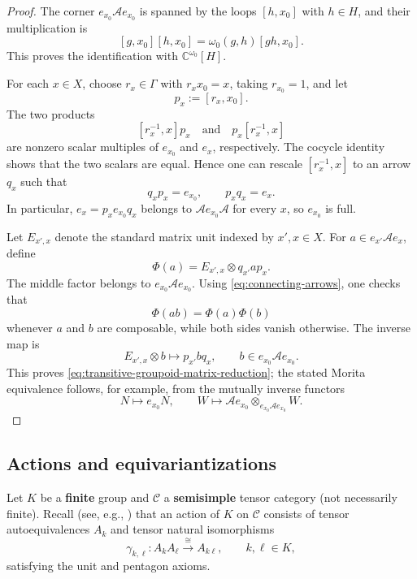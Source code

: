 \documentclass{amsart}
\theoremstyle{definition}
\newcommand{\C}{\mathscr{C}}
\numberwithin{equation}{section}
\begin{document}
\begin{proof}
The corner $e_{x_0}\mathcal A e_{x_0}$ is spanned by the loops $[h,x_0]$ with
$h\in H$, and their multiplication is
\[
 [g,x_0][h,x_0]=\omega_0(g,h)[gh,x_0].
\]
This proves the identification with $\mathbb C^{\omega_0}[H]$.

For each $x\in X$, choose $r_x\in\Gamma$ with $r_xx_0=x$, taking
$r_{x_0}=1$, and let
\[
 p_x:=[r_x,x_0].
\]
The two products
\[
 [r_x^{-1},x]p_x
 \quad\text{and}\quad
 p_x[r_x^{-1},x]
\]
are nonzero scalar multiples of $e_{x_0}$ and $e_x$, respectively.  The cocycle
identity shows that the two scalars are equal.  Hence one can rescale
$[r_x^{-1},x]$ to an arrow $q_x$ such that
\begin{equation}\label{eq:connecting-arrows}
 q_xp_x=e_{x_0},
 \qquad
 p_xq_x=e_x.
\end{equation}
In particular, $e_x=p_xe_{x_0}q_x$ belongs to
$\mathcal A e_{x_0}\mathcal A$ for every $x$, so $e_{x_0}$ is full.

Let $E_{x',x}$ denote the standard matrix unit indexed by $x',x\in X$.  For
$a\in e_{x'}\mathcal A e_x$, define
\begin{equation}\label{eq:explicit-groupoid-matrix-map}
 \Phi(a)=E_{x',x}\otimes q_{x'}ap_x.
\end{equation}
The middle factor belongs to $e_{x_0}\mathcal A e_{x_0}$.  Using
\eqref{eq:connecting-arrows}, one checks that
\[
 \Phi(ab)=\Phi(a)\Phi(b)
\]
whenever $a$ and $b$ are composable, while both sides vanish otherwise.  The
inverse map is
\[
 E_{x',x}\otimes b\longmapsto p_{x'}bq_x,
 \qquad
 b\in e_{x_0}\mathcal A e_{x_0}.
\]
This proves \eqref{eq:transitive-groupoid-matrix-reduction}; the stated Morita
equivalence follows, for example, from the mutually inverse functors
\[
 N\longmapsto e_{x_0}N,
 \qquad
 W\longmapsto \mathcal A e_{x_0}
       \otimes_{e_{x_0}\mathcal A e_{x_0}}W.
\]
\end{proof}

\subsection{Actions and equivariantizations}\label{sec:actions}

Let $K$ be a {\bf finite} group and $\C$ a {\bf semisimple} tensor category (not necessarily finite). Recall (see, e.g., \cite[Definition 2.7.1]{EGNO}) that an action of $K$
on $\C$ consists of tensor autoequivalences $A_k$ and tensor natural
isomorphisms
\[
 \gamma_{k,\ell}:A_kA_\ell\xrightarrow{\cong}A_{k\ell},
 \qquad k,\ell\in K,
\]
satisfying the unit and pentagon axioms.
\end{document}
